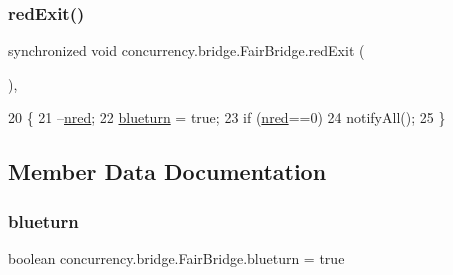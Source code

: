 \subsubsection{\texorpdfstring{red\+Exit()}{redExit()}}
{\footnotesize\ttfamily synchronized void concurrency.\+bridge.\+Fair\+Bridge.\+red\+Exit (\begin{DoxyParamCaption}{ }\end{DoxyParamCaption})\hspace{0.3cm}{\ttfamily [inline]}, {\ttfamily [package]}}


\begin{DoxyCode}
20                                \{
21         --\mbox{\hyperlink{classconcurrency_1_1bridge_1_1_fair_bridge_a858202569a7a17b2a613da82f56ce92a}{nred}};
22         \mbox{\hyperlink{classconcurrency_1_1bridge_1_1_fair_bridge_ab83efd0c4e3b7e9b16f57361e6f4826b}{blueturn}} = \textcolor{keyword}{true};
23         \textcolor{keywordflow}{if} (\mbox{\hyperlink{classconcurrency_1_1bridge_1_1_fair_bridge_a858202569a7a17b2a613da82f56ce92a}{nred}}==0)
24             notifyAll();
25     \}
\end{DoxyCode}


\subsection{Member Data Documentation}
\mbox{\label{classconcurrency_1_1bridge_1_1_fair_bridge_ab83efd0c4e3b7e9b16f57361e6f4826b}} 
\subsubsection{\texorpdfstring{blueturn}{blueturn}}
{\footnotesize\ttfamily boolean concurrency.\+bridge.\+Fair\+Bridge.\+blueturn = true\hspace{0.3cm}{\ttfamily [private]}}

\mbox{\label{classconcurrency_1_1bridge_1_1_fair_bridge_a5af7f149ac3d495f24119357e9b52263}} 
